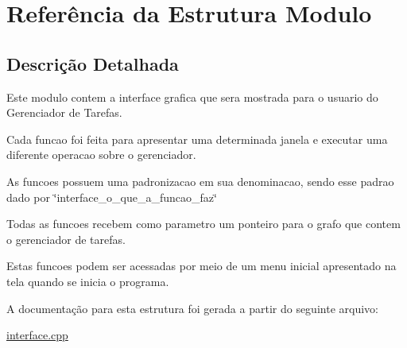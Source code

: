 \hypertarget{structModulo}{}\section{Referência da Estrutura Modulo}
\label{structModulo}


\subsection{Descrição Detalhada}
Este modulo contem a interface grafica que sera mostrada para o usuario do Gerenciador de Tarefas.

Cada funcao foi feita para apresentar uma determinada janela e executar uma diferente operacao sobre o gerenciador.

As funcoes possuem uma padronizacao em sua denominacao, sendo esse padrao dado por \char`\"{}interface\+\_\+o\+\_\+que\+\_\+a\+\_\+funcao\+\_\+faz\char`\"{}

Todas as funcoes recebem como parametro um ponteiro para o grafo que contem o gerenciador de tarefas.

Estas funcoes podem ser acessadas por meio de um menu inicial apresentado na tela quando se inicia o programa. 

A documentação para esta estrutura foi gerada a partir do seguinte arquivo\+:\begin{DoxyCompactItemize}
\item 
\hyperlink{interface_8cpp}{interface.\+cpp}\end{DoxyCompactItemize}

